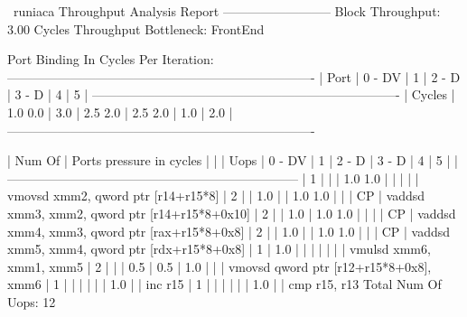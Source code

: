 \begin{LabeledExample}{\iaca\ run}{iaca}
  Throughput Analysis Report
  --------------------------
  Block Throughput: 3.00 Cycles       Throughput Bottleneck: FrontEnd
  
  Port Binding In Cycles Per Iteration:
  -------------------------------------------------------------------------
  |  Port  |  0   -  DV  |  1   |  2   -  D   |  3   -  D   |  4   |  5   |
  -------------------------------------------------------------------------
  | Cycles | 1.0    0.0  | 3.0  | 2.5    2.0  | 2.5    2.0  | 1.0  | 2.0  |
  -------------------------------------------------------------------------
  
      
  | Num Of |              Ports pressure in cycles               |    |
  |  Uops  |  0  - DV  |  1  |  2  -  D  |  3  -  D  |  4  |  5  |    |
  ---------------------------------------------------------------------
  |   1    |           |     | 1.0   1.0 |           |     |     |    | vmovsd xmm2, qword ptr [r14+r15*8]
  |   2    |           | 1.0 |           | 1.0   1.0 |     |     | CP | vaddsd xmm3, xmm2, qword ptr [r14+r15*8+0x10]
  |   2    |           | 1.0 | 1.0   1.0 |           |     |     | CP | vaddsd xmm4, xmm3, qword ptr [rax+r15*8+0x8]
  |   2    |           | 1.0 |           | 1.0   1.0 |     |     | CP | vaddsd xmm5, xmm4, qword ptr [rdx+r15*8+0x8]
  |   1    | 1.0       |     |           |           |     |     |    | vmulsd xmm6, xmm1, xmm5
  |   2    |           |     | 0.5       | 0.5       | 1.0 |     |    | vmovsd qword ptr [r12+r15*8+0x8], xmm6
  |   1    |           |     |           |           |     | 1.0 |    | inc r15
  |   1    |           |     |           |           |     | 1.0 |    | cmp r15, r13
  Total Num Of Uops: 12
\end{LabeledExample}















